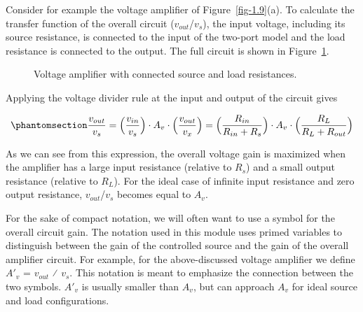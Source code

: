 \documentclass[
  11pt,
  letterpaper,
  abstract]{scrbook}
\begin{document}
Consider for example the voltage amplifier of Figure~\ref{fig-1.9}(a).
To calculate the transfer function of the overall circuit
(\(v_{out}\)/\(v_s\)), the input voltage, including its source
resistance, is connected to the input of the two-port model and the load
resistance is connected to the output. The full circuit is shown in
Figure~\ref{fig-1.10}.

\begin{figure}


\caption{\label{fig-1.10}Voltage amplifier with connected source and
load resistances.}

\end{figure}%

Applying the voltage divider rule at the input and output of the circuit
gives

\begin{equation}\phantomsection\label{eq-1.1}{
\frac{v_{out}}{v_s} = \Bigl(\frac{v_{in}}{v_s}\Bigr) \cdot A_v \cdot \Bigl(\frac{v_{out}}{v_x}\Bigr) = \Bigl(\frac{R_{in}}{R_{in} + R_s}\Bigr) \cdot A_v \cdot \Bigl(\frac{R_{L}}{R_{L} + R_{out}}\Bigr)
}\end{equation}

As we can see from this expression, the overall voltage gain is
maximized when the amplifier has a large input resistance (relative to
\(R_s\)) and a small output resistance (relative to \(R_L\)). For the
ideal case of infinite input resistance and zero output resistance,
\(v_{out}\)/\(v_s\) becomes equal to \(A_v\).

For the sake of compact notation, we will often want to use a symbol for
the overall circuit gain. The notation used in this module uses primed
variables to distinguish between the gain of the controlled source and
the gain of the overall amplifier circuit. For example, for the
above-discussed voltage amplifier we define \(A'_v\) = \(v_{out}\) ⁄
\(v_s\). This notation is meant to emphasize the connection between the
two symbols. \(A'_v\) is usually smaller than \(A_v\), but can approach
\(A_v\) for ideal source and load configurations.
\end{document}
